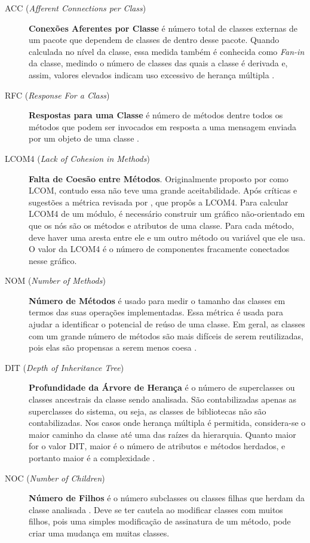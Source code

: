 \begin{description}

	\item[ACC (\textit{Afferent Connections per Class})] 
	\textbf{Conexões Aferentes por Classe} é número total de classes externas 
	de um pacote que dependem de classes de dentro desse pacote. Quando 
	calculada no nível da classe, essa medida também é conhecida como 
	\textit{Fan-in} da classe, medindo o número de classes das quais a classe é 
	derivada e, assim, valores elevados indicam uso excessivo de herança 
	múltipla \cite{McCabe94} \cite{Chidamber94}.
	
	
	\item[RFC (\textit{Response For a Class})] \textbf{Respostas para uma 
	Classe} é número de métodos dentre todos os métodos que podem ser invocados 
	em resposta a uma mensagem enviada por um objeto de uma classe 
	\cite{Sharble93}.
	
	\item[LCOM4 (\textit{Lack of Cohesion in Methods})] \textbf{Falta de Coesão
	entre Métodos}. Originalmente proposto por  
	como LCOM, contudo essa não teve uma grande aceitabilidade. Após críticas e 
	sugestões a métrica revisada por , que propôs a LCOM4. 
	Para calcular LCOM4 de um módulo, é necessário construir um gráfico 
	não-orientado em que os nós são os métodos e atributos de uma classe. Para
	cada método, deve haver uma aresta entre ele e um outro método ou variável 
	que ele usa. O valor da LCOM4 é o número de componentes fracamente 
	conectados nesse gráfico. 

	
	\item[NOM (\textit{Number of Methods})] \textbf{Número de Métodos} é usado 
	para medir o tamanho das classes em termos das suas operações 
	implementadas. Essa métrica é usada para ajudar a identificar o 
	potencial de reúso de uma classe. Em geral, as classes com um grande 
	número de métodos são mais difíceis de serem reutilizadas, pois elas 
	são propensas a serem menos coesa \cite{Lorenz94}.
	

	\item [DIT (\textit{Depth of Inheritance Tree})] \textbf{Profundidade da 
	Árvore de Herança} é o número de superclasses ou classes ancestrais da 
	classe sendo analisada. São contabilizadas apenas as superclasses do 
	sistema, ou seja, as classes de bibliotecas não são contabilizadas. 
	Nos casos onde herança múltipla é permitida, considera-se o maior 
	caminho da classe até uma das raízes da hierarquia. Quanto maior for o 
	valor DIT, maior é o número de atributos e métodos herdados, e portanto 
	maior é a complexidade \cite{Shih97}.
	
	\item[NOC (\textit{Number of Children})] \textbf{Número de Filhos} é o 
	número subclasses ou classes filhas que herdam da classe analisada 
	\cite{Rosenberg97}. Deve se ter cautela ao modificar classes com muitos 
	filhos, pois uma simples modificação de assinatura de um método, pode criar
	uma mudança em muitas classes.
	

\end{description}
	
